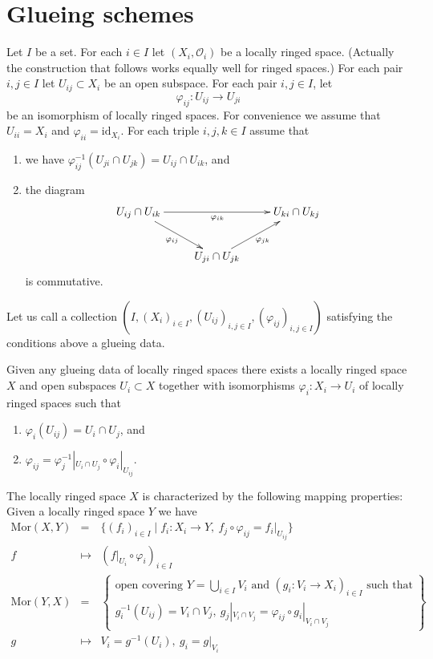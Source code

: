\section{Glueing schemes}
\label{section-glueing-schemes}

\noindent
Let $I$ be a set.
For each $i \in I$ let $(X_i, \mathcal{O}_i)$ be
a locally ringed space. (Actually the construction that
follows works equally well for ringed spaces.)
For each pair $i, j \in I$ let $U_{ij} \subset X_i$
be an open subspace.
For each pair $i, j \in I$, let
$$
\varphi_{ij} : U_{ij} \to U_{ji}
$$
be an isomorphism of locally ringed spaces.
For convenience we assume that $U_{ii} = X_i$ and
$\varphi_{ii} = \text{id}_{X_i}$.
For each triple $i, j, k \in I$ assume that
\begin{enumerate}
\item we have
$\varphi_{ij}^{-1}(U_{ji} \cap U_{jk}) =  U_{ij} \cap U_{ik}$, and
\item the diagram
$$
\xymatrix{
U_{ij} \cap U_{ik} \ar[rr]_{\varphi_{ik}} \ar[rd]_{\varphi_{ij}} & &
U_{ki} \cap U_{kj} \\
& U_{ji} \cap U_{jk} \ar[ru]_{\varphi_{jk}}
}
$$
is commutative.
\end{enumerate}
Let us call a collection
$(I, (X_i)_{i\in I}, (U_{ij})_{i, j\in I}, (\varphi_{ij})_{i, j\in I})$
satisfying the conditions above a glueing data.

\begin{lemma}
\label{lemma-glue}
Given any glueing data of locally ringed spaces there
exists a locally ringed space $X$ and open subspaces
$U_i \subset X$ together with isomorphisms
$\varphi_i : X_i \to U_i$ of locally ringed spaces such that
\begin{enumerate}
\item $\varphi_i(U_{ij}) = U_i \cap U_j$, and
\item $\varphi_{ij} =
\varphi_j^{-1}|_{U_i \cap U_j} \circ \varphi_i|_{U_{ij}}$.
\end{enumerate}
The locally ringed space $X$ is characterized by the following
mapping properties: Given a locally ringed space $Y$ we have
\begin{eqnarray*}
\text{Mor}(X, Y) & = & \{ (f_i)_{i\in I} \mid
f_i : X_i \to Y, \ f_j \circ \varphi_{ij} = f_i|_{U_{ij}}\} \\
f & \mapsto & (f|_{U_i} \circ \varphi_i)_{i \in I} \\
\text{Mor}(Y, X) & = &
\left\{
\begin{matrix}
\text{open covering }Y = \bigcup\nolimits_{i \in I} V_i\text{ and }
(g_i : V_i \to X_i)_{i \in I}
\text{ such that}\\
g_i^{-1}(U_{ij}) = V_i \cap V_j, \ 
g_j|_{V_i \cap V_j} = \varphi_{ij} \circ g_i|_{V_i \cap V_j}
\end{matrix}
\right\} \\
g & \mapsto &
V_i = g^{-1}(U_i), \ g_i = g|_{V_i}
\end{eqnarray*}
\end{lemma}

